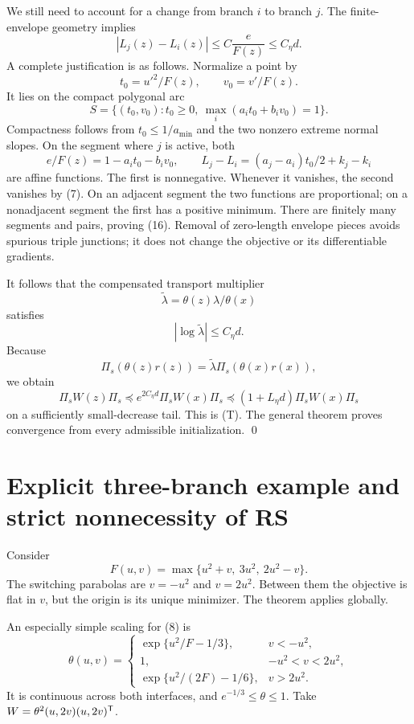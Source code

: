 We still need to account for a change from branch $i$ to branch $j$. The finite-envelope geometry implies
\begin{equation}
 |L_j(z)-L_i(z)|\le C\frac{e}{F(z)}\le C_\eta d. \tag{Q.16}
\end{equation}
A complete justification is as follows. Normalize a point by
\[
 t_0=u'^2/F(z),\qquad v_0=v'/F(z).
\]
It lies on the compact polygonal arc
\[
 S=\{(t_0,v_0):t_0\ge0,\ \max_i(a_it_0+b_iv_0)=1\}.
\]
Compactness follows from $t_0\le1/a_{\min}$ and the two nonzero extreme normal slopes. On the segment where $j$ is active, both
\[
 e/F(z)=1-a_it_0-b_iv_0,\qquad
 L_j-L_i=(a_j-a_i)t_0/2+k_j-k_i
\]
are affine functions. The first is nonnegative. Whenever it vanishes, the second vanishes by (7). On an adjacent segment the two functions are proportional; on a nonadjacent segment the first has a positive minimum. There are finitely many segments and pairs, proving (16). Removal of zero-length envelope pieces avoids spurious triple junctions; it does not change the objective or its differentiable gradients.

It follows that the compensated transport multiplier
\[
 \widetilde\lambda=\theta(z)\lambda/\theta(x)
\]
satisfies
\begin{equation}
 |\log\widetilde\lambda|\le C_\eta d. \tag{Q.17}
\end{equation}
Because
\[
 \Pi_s(\theta(z)r(z))=\widetilde\lambda\Pi_s(\theta(x)r(x)),
\]
we obtain
\[
 \Pi_sW(z)\Pi_s\preceq e^{2C_\eta d}\Pi_sW(x)\Pi_s
 \preceq(1+L_\eta d)\Pi_sW(x)\Pi_s
\]
on a sufficiently small-decrease tail. This is (T). The general theorem proves convergence from every admissible initialization. \qed


\setcounter{section}{5}
\setcounter{theorem}{2}
\setcounter{lemma}{0}
\setcounter{corollary}{0}
\setcounter{proposition}{0}
\setcounter{remark}{0}
\setcounter{equation}{13}
\section{Explicit three-branch example and strict nonnecessity of RS}
Consider
\begin{equation}
 F(u,v)=\max\{u^2+v,\ 3u^2,\ 2u^2-v\}. \tag{Q.18}
\end{equation}
The switching parabolas are $v=-u^2$ and $v=2u^2$. Between them the objective is flat in $v$, but the origin is its unique minimizer. The theorem applies globally.

An especially simple scaling for (8) is
\[
 \theta(u,v)=
 \begin{cases}
 \exp\{u^2/F-1/3\},&v<-u^2,\\
 1,&-u^2<v<2u^2,\\
 \exp\{u^2/(2F)-1/6\},&v>2u^2.
 \end{cases}
\]
It is continuous across both interfaces, and $e^{-1/3}\le\theta\le1$. Take $W=\theta^2(u,2v)(u,2v)^{\mathsf T}$.

